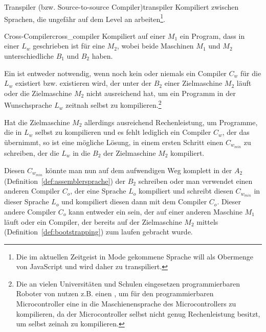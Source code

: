 \begin{Definition}{Transpiler (bzw. Source-to-source Compiler)}{transpiler}
  Kompiliert zwischen Sprachen, die ungefähr auf dem  Level an  arbeiten\footnote{Die im aktuellen Zeitgeist in Mode gekommene Sprache  will als Obermenge von JavaScript %
  und wird daher zu  transpiliert.}.
\end{Definition}

\begin{Definition}{Cross-Compiler}{cross_compiler}
  Kompiliert auf einer  $M_1$ ein Program, dass in einer  $L_w$ geschrieben ist für eine  $M_2$, wobei beide Maschinen $M_1$ und $M_2$ unterschiedliche  $B_1$ und $B_2$ haben.
\end{Definition}

  Ein  ist entweder notwendig, wenn noch kein oder niemals ein Compiler $C_w$ für die  $L_w$ existiert bzw. existieren wird, der unter der  $B_2$ einer Zielmaschine $M_2$ läuft oder die Zielmaschine $M_2$ nicht ausreichend  hat, um ein Programm in der Wunschsprache $L_w$ zeitnah selbst zu kompilieren.\footnote{Die an vielen Universitäten und Schulen eingesetzen programmierbaren Roboter von  nutzen z.B. einen , um für den programmierbaren Microcontroller eine  in die Maschienensprache des Microcontrollers zu kompilieren, da der Microcontroller selbst nicht genug Rechenleistung besitzt, um selbst zeinah zu kompilieren.}

  Hat die Zielmaschine $M_2$ allerdings ausreichend Rechenleistung, um Programme, die in $L_w$ selbst zu kompilieren und es fehlt lediglich ein Compiler $C_w$, der das übernimmt, so ist eine mögliche Lösung, in einem ersten Schritt einen  $C_{w_{min}}$ zu schreiben, der die  $L_w$ in die  $B_2$ der Zielmaschine $M_2$ kompiliert.

  Diesen  $C_{w_{min}}$ könnte man nun auf dem aufwendigen Weg komplett in der  $A_2$ (Definition~\ref{def:assemblersprache}) der  $B_2$ schreiben oder man verwendet einen anderen Compiler $C_o$, der eine Sprache $L_o$ kompiliert und schreibt diesen  $C_{w_{min}}$ in dieser Sprache $L_o$ und kompiliert diesen dann mit dem Compiler $C_o$. Dieser andere Compiler $C_o$ kann entweder ein  sein, der auf einer anderen Maschine $M_1$ läuft oder ein Compiler, der bereits auf der Zielmaschine $M_2$ mittels  (Definition~\ref{def:bootstrapping}) zum laufen gebracht wurde.

